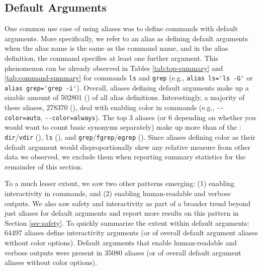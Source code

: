 \subsection{Default Arguments}

One common use case of using aliases was to define commands with default arguments.
More specifically, we refer to an alias as defining default arguments when the alias name is the same as the command name, and in the alias definition, the command specifies at least one further argument.
This phenomenon can be already observed in Tables \ref{tab:top-summary} and \ref{tab:command-summary} for commands \verb|ls| and \verb|grep| (e.g., \verb|alias ls='ls -G'| or \verb|alias grep='grep -i'|).
Overall, aliases defining default arguments make up a sizable amount of \num{502801} () of all alias definitions. 
Interestingly, a majority of these aliases, \num{278370} (), deal with enabling color in commands (e.g., \verb|--color=auto|, \verb|--color=always|).
The top 3 aliases (or 6 depending on whether you would want to count basic synonyms separately) make up more than  of the : \verb|dir|/\verb|vdir| (), \verb|ls| (), and \verb|grep|/\verb|fgrep|/\verb|egrep| ().
Since aliases defining color as their default argument would disproportionally skew any relative measure from other data we observed, we exclude them when reporting summary statistics for the remainder of this section.

To a much lesser extent, we saw two other patterns emerging: (1) enabling interactivity in commands, and (2) enabling human-readable and verbose outputs.
We also saw safety and interactivity as part of a broader trend beyond just aliases for default arguments and report more results on this pattern in Section \ref{sec:safety}.
To quickly summarize the extent within default arguments: \num{64497} aliases define interactivity arguments (or  of overall default argument aliases without color options).
Default arguments that enable human-readable and verbose outputs were present in \num{35080} aliases (or  of overall default argument aliases without color options).

